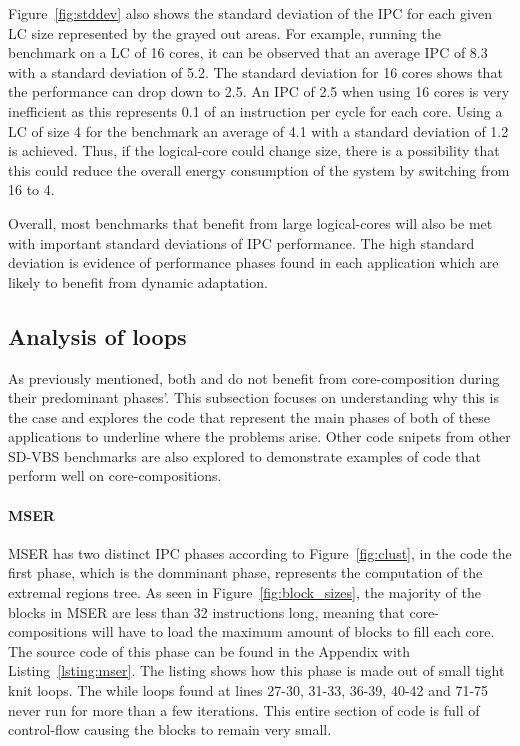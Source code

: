 Figure~\ref{fig:stddev} also shows the standard deviation of the IPC for each given LC size represented by the grayed out areas.
For example, running the  benchmark on a LC of 16 cores, it can be observed that an average IPC of 8.3 with a standard deviation of 5.2.
The standard deviation for 16 cores shows that the performance can drop down to 2.5.
An IPC of 2.5 when using 16 cores is very inefficient as this represents 0.1 of an instruction per cycle for each core.
Using a LC of size 4 for the  benchmark an average of 4.1 with a standard deviation of 1.2 is achieved.
Thus, if the logical-core could change size, there is a possibility that this could reduce the overall energy consumption of the system by switching from 16 to 4.

Overall, most benchmarks that benefit from large logical-cores will also be met with important standard deviations of IPC performance.
The high standard deviation is evidence of performance phases found in each application which are likely to benefit from dynamic adaptation.

\subsection{Analysis of loops}

As previously mentioned, both  and  do not benefit from core-composition during their predominant phases'.
This subsection focuses on understanding why this is the case and explores the code that represent the main phases of both of these applications to underline where the problems arise.
Other code snipets from other SD-VBS benchmarks are also explored to demonstrate examples of code that perform well on core-compositions.

\paragraph{MSER}

MSER has two distinct IPC phases according to Figure~\ref{fig:clust}, in the code the first phase, which is the domminant phase, represents the computation of the extremal regions tree.
As seen in Figure~\ref{fig:block_sizes}, the majority of the blocks in MSER are less than 32 instructions long, meaning that core-compositions will have to load the maximum amount of blocks to fill each core.
The source code of this phase can be found in the Appendix with Listing~\ref{lsting:mser}.
The listing shows how this phase is made out of small tight knit loops.
The while loops found at lines 27-30, 31-33, 36-39, 40-42 and 71-75 never run for more than a few iterations.
This entire section of code is full of control-flow causing the blocks to remain very small.

